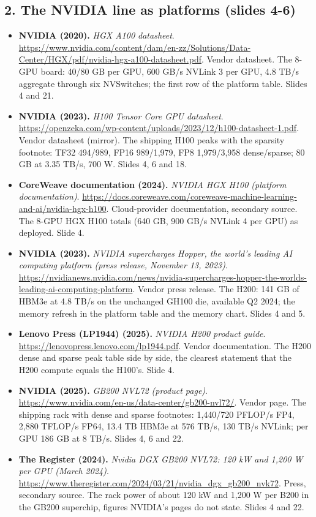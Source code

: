 \documentclass[11pt,letterpaper]{article}
\begin{document}
\subsection*{2. The NVIDIA line as platforms (slides 4-6)}
\begin{itemize}[leftmargin=1.2em,itemsep=3pt]\sloppy
\item \textbf{NVIDIA (2020).} \textit{HGX A100 datasheet}. \url{https://www.nvidia.com/content/dam/en-zz/Solutions/Data-Center/HGX/pdf/nvidia-hgx-a100-datasheet.pdf}. Vendor datasheet. The 8-GPU board: 40/80 GB per GPU, 600 GB/s NVLink 3 per GPU, 4.8 TB/s aggregate through six NVSwitches; the first row of the platform table. Slides 4 and 21.
\item \textbf{NVIDIA (2023).} \textit{H100 Tensor Core GPU datasheet}. \url{https://openzeka.com/wp-content/uploads/2023/12/h100-datasheet-1.pdf}. Vendor datasheet (mirror). The shipping H100 peaks with the sparsity footnote: TF32 494/989, FP16 989/1,979, FP8 1,979/3,958 dense/sparse; 80 GB at 3.35 TB/s, 700 W. Slides 4, 6 and 18.
\item \textbf{CoreWeave documentation (2024).} \textit{NVIDIA HGX H100 (platform documentation)}. \url{https://docs.coreweave.com/coreweave-machine-learning-and-ai/nvidia-hgx-h100}. Cloud-provider documentation, secondary source. The 8-GPU HGX H100 totals (640 GB, 900 GB/s NVLink 4 per GPU) as deployed. Slide 4.
\item \textbf{NVIDIA (2023).} \textit{NVIDIA supercharges Hopper, the world's leading AI computing platform (press release, November 13, 2023)}. \url{https://nvidianews.nvidia.com/news/nvidia-supercharges-hopper-the-worlds-leading-ai-computing-platform}. Vendor press release. The H200: 141 GB of HBM3e at 4.8 TB/s on the unchanged GH100 die, available Q2 2024; the memory refresh in the platform table and the memory chart. Slides 4 and 5.
\item \textbf{Lenovo Press (LP1944) (2025).} \textit{NVIDIA H200 product guide}. \url{https://lenovopress.lenovo.com/lp1944.pdf}. Vendor documentation. The H200 dense and sparse peak table side by side, the clearest statement that the H200 compute equals the H100's. Slide 4.
\item \textbf{NVIDIA (2025).} \textit{GB200 NVL72 (product page)}. \url{https://www.nvidia.com/en-us/data-center/gb200-nvl72/}. Vendor page. The shipping rack with dense and sparse footnotes: 1,440/720 PFLOP/s FP4, 2,880 TFLOP/s FP64, 13.4 TB HBM3e at 576 TB/s, 130 TB/s NVLink; per GPU 186 GB at 8 TB/s. Slides 4, 6 and 22.
\item \textbf{The Register (2024).} \textit{Nvidia DGX GB200 NVL72: 120 kW and 1,200 W per GPU (March 2024)}. \url{https://www.theregister.com/2024/03/21/nvidia_dgx_gb200_nvk72}. Press, secondary source. The rack power of about 120 kW and 1,200 W per B200 in the GB200 superchip, figures NVIDIA's pages do not state. Slides 4 and 22.

\end{itemize}
\end{document}
